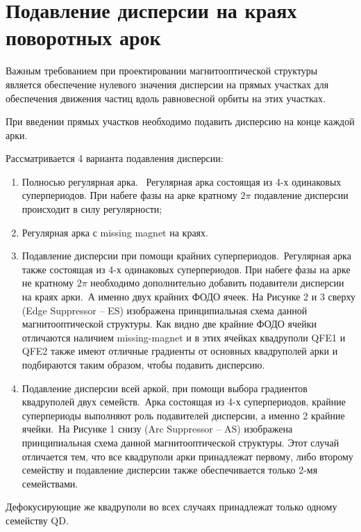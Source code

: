 \section{Подавление дисперсии на краях поворотных арок}\label{sec:transition_variation/disp_supperssion}

\par Важным требованием при проектировании магнитооптической структуры является обеспечение нулевого значения дисперсии на прямых участках для обеспечения движения частиц вдоль равновесной орбиты на этих участках.

При введении прямых участков необходимо подавить дисперсию на конце каждой арки.

Рассматривается 4 варианта подавления дисперсии:

\begin{enumerate} 
\item	Полносью регулярная арка. \ Регулярная арка состоящая из 4-х одинаковых суперпериодов. При набеге фазы на арке кратному $2\pi$ подавление дисперсии происходит в силу регулярности;
\item Регулярная арка с missing magnet на краях.
\item	Подавление дисперсии при помощи крайних суперпериодов.\
Регулярная арка также состоящая из 4-х одинаковых суперпериодов. При набеге фазы на арке не кратному $2\pi$ необходимо дополнительно добавить подавители дисперсии на краях арки.\
А именно двух крайних ФОДО ячеек. На Рисунке 2 и 3 сверху (Edge Suppressor – ES) изображена принципиальная схема данной магнитооптической структуры. Как видно две крайние ФОДО ячейки отличаются наличием missing-magnet и в этих ячейках квадруполи QFE1 и QFE2 также имеют отличные градиенты от основных квадруполей арки и подбираются таким образом, чтобы подавить дисперсию.
\item	Подавление дисперсии всей аркой, при помощи выбора градиентов квадруполей двух семейств.\
Арка состоящая из 4-х суперпериодов, крайние суперпериоды выполняют роль подавителей дисперсии, а именно 2 крайние ячейки.\
На Рисунке 1 снизу (Arc Suppressor – AS) изображена принципиальная схема данной магнитооптической структуры. Этот случай отличается тем, что все квадруполи арки принадлежат первому, либо второму семейству и подавление дисперсии также обеспечивается только 2-мя семействами.
\end{enumerate} 

\noindent Дефокусирующие же квадруполи во всех случаях принадлежат только одному семейству QD.	

